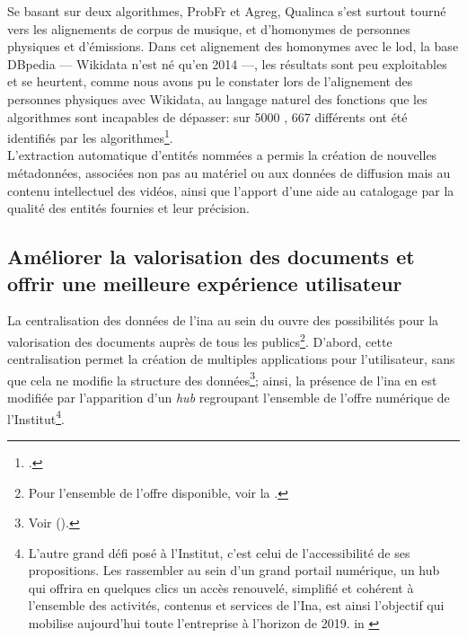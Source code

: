 Se basant sur deux algorithmes, ProbFr et Agreg, Qualinca s'est surtout tourné vers les alignements de corpus de musique, et d'homonymes de personnes physiques et d'émissions. Dans cet alignement des homonymes avec le \ac{lod}, la base DBpedia --- Wikidata n'est né qu'en 2014 ---, les résultats sont peu exploitables et se heurtent, comme nous avons pu le constater lors de l'alignement des personnes physiques avec Wikidata, au langage naturel des fonctions que les algorithmes sont incapables de dépasser: sur 5000 , 667 différents ont été identifiés par les algorithmes\footcite[p.133]{alquier_production_2017}.\\

L'extraction automatique d'entités nommées a permis la création de nouvelles métadonnées, associées non pas au matériel ou aux données de diffusion mais au contenu intellectuel des vidéos, ainsi que l'apport d'une aide au catalogage par la qualité des entités fournies et leur précision.

\subsection{\label{III-B-3-c}Améliorer la valorisation des documents et offrir une meilleure expérience utilisateur}

La centralisation des données de l'\ac{ina} au sein du \ldd ouvre des possibilités pour la valorisation des documents auprès de tous les publics\footnote{Pour l'ensemble de l'offre disponible, voir la .}. D'abord, cette centralisation permet la création de multiples applications pour l'utilisateur, sans que cela ne modifie la structure des données\footnote{Voir  ().}; ainsi, la présence de l'\ac{ina} en est modifiée par l'apparition d'un \textit{hub} regroupant l'ensemble de l'offre numérique de l'Institut\footnote{\og L’autre grand défi posé à l’Institut, c’est celui de l’accessibilité de ses propositions. Les rassembler au sein d’un grand portail numérique, un hub qui offrira en quelques clics un accès renouvelé, simplifié et cohérent à l’ensemble des activités, contenus et services de l’Ina, est ainsi l’objectif qui mobilise aujourd’hui toute l’entreprise à l’horizon de 2019.\fg{} in \cite{vallet_ina_nodate}}.\\

